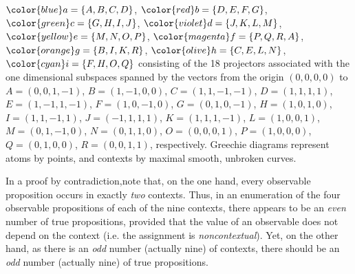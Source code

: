 $\color{blue}a=\{A,B,C,D\}$,
$\color{red}b=\{D,E,F,G\}$,
$\color{green}c=\{G,H,I,J\}$,
$\color{violet}d=\{J,K,L,M\}$,
$\color{yellow}e=\{M,N,O,P\}$,
$\color{magenta}f=\{P,Q,R,A\}$,
$\color{orange}g=\{B,I,K,R\}$,
$\color{olive}h=\{C,E,L,N\}$,
$\color{cyan}i=\{F,H,O,Q\}$
consisting of the 18 projectors associated with the one dimensional subspaces spanned by  the vectors from the origin $(0,0,0,0)$ to
$ A=(0,0,1,-1)    $,
$ B=(1,-1,0,0)    $,
$ C=(1,1,-1,-1)   $,
$ D=(1,1,1,1)     $,
$  E=(1,-1,1,-1)  $,
$  F=(1,0,-1,0)   $,
$  G=(0,1,0,-1)   $,
$  H=(1,0,1,0)    $,
$  I=(1,1,-1,1)   $,
$ J=(-1,1,1,1)    $,
$ K=(1,1,1,-1)    $,
$ L=(1,0,0,1)     $,
$ M=(0,1,-1,0)    $,
$  N=(0,1,1,0)    $,
$  O=(0,0,0,1)    $,
$  P=(1,0,0,0)    $,
$  Q=(0,1,0,0)    $,
$  R=(0,0,1,1)    $, respectively.
%
Greechie diagrams represent atoms by points, and  contexts by maximal smooth, unbroken curves.

{\color{OliveGreen}\bproof
In a proof by contradiction,note that, on the one hand, every observable proposition occurs in exactly {\em two} contexts.
Thus, in an enumeration of the four observable propositions of each of the nine contexts,
there appears to be an {\em even} number of true propositions,
provided that the value of an observable does not depend on the context (i.e. the assignment is {\em noncontextual}).
Yet, on the other hand, as there is an {\em odd} number (actually nine) of contexts,
there should be an {\em odd} number (actually nine) of true propositions.
\bproof
}





\begin{center}
{\color{olive}   \Huge
 \floweroneleft
}
\end{center}


